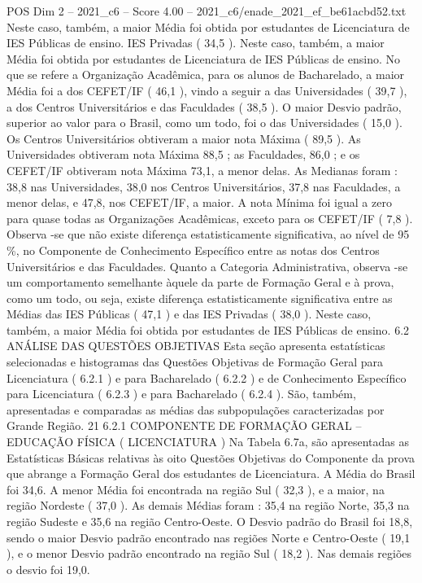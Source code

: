\begin{textsample}{POS Dim 2 – 2021\_c6 – Score 4.00 – 2021\_c6/enade\_2021\_ef\_be61acbd52.txt}
Neste caso, também, a maior Média foi obtida por estudantes de Licenciatura de IES Públicas de ensino.
IES Privadas ( 34,5 ).
Neste caso, também, a maior Média foi obtida por estudantes de Licenciatura de IES Públicas de ensino.
No que se refere a Organização Acadêmica, para os alunos de Bacharelado, a maior Média foi a dos CEFET/IF ( 46,1 ), vindo a seguir a das Universidades ( 39,7 ), a dos Centros Universitários e das Faculdades ( 38,5 ).
O maior Desvio padrão, superior ao valor para o Brasil, como um todo, foi o das Universidades ( 15,0 ).
Os Centros Universitários obtiveram a maior nota Máxima ( 89,5 ).
As Universidades obtiveram nota Máxima 88,5 ; as Faculdades, 86,0 ; e os CEFET/IF obtiveram nota Máxima 73,1, a menor delas.
As Medianas foram : 38,8 nas Universidades, 38,0 nos Centros Universitários, 37,8 nas Faculdades, a menor delas, e 47,8, nos CEFET/IF, a maior.
A nota Mínima foi igual a zero para quase todas as Organizações Acadêmicas, exceto para os CEFET/IF ( 7,8 ).
Observa -se que não existe diferença estatisticamente significativa, ao nível de 95 \%, no Componente de Conhecimento Específico entre as notas dos Centros Universitários e das Faculdades.
Quanto a Categoria Administrativa, observa -se um comportamento semelhante àquele da parte de Formação Geral e à prova, como um todo, ou seja, existe diferença estatisticamente significativa entre as Médias das IES Públicas ( 47,1 ) e das IES Privadas ( 38,0 ).
Neste caso, também, a maior Média foi obtida por estudantes de IES Públicas de ensino. 6.2 ANÁLISE DAS QUESTÕES OBJETIVAS Esta seção apresenta estatísticas selecionadas e histogramas das Questões Objetivas de Formação Geral para Licenciatura ( 6.2.1 ) e para Bacharelado ( 6.2.2 ) e de Conhecimento Específico para Licenciatura ( 6.2.3 ) e para Bacharelado ( 6.2.4 ).
São, também, apresentadas e comparadas as médias das subpopulações caracterizadas por Grande Região. 21 6.2.1 COMPONENTE DE FORMAÇÃO GERAL – EDUCAÇÃO FÍSICA ( LICENCIATURA ) Na Tabela 6.7a, são apresentadas as Estatísticas Básicas relativas às oito Questões Objetivas do Componente da prova que abrange a Formação Geral dos estudantes de Licenciatura.
A Média do Brasil foi 34,6.
A menor Média foi encontrada na região Sul ( 32,3 ), e a maior, na região Nordeste ( 37,0 ).
As demais Médias foram : 35,4 na região Norte, 35,3 na região Sudeste e 35,6 na região Centro-Oeste.
O Desvio padrão do Brasil foi 18,8, sendo o maior Desvio padrão encontrado nas regiões Norte e Centro-Oeste ( 19,1 ), e o menor Desvio padrão encontrado na região Sul ( 18,2 ).
Nas demais regiões o desvio foi 19,0.

\end{textsample}
